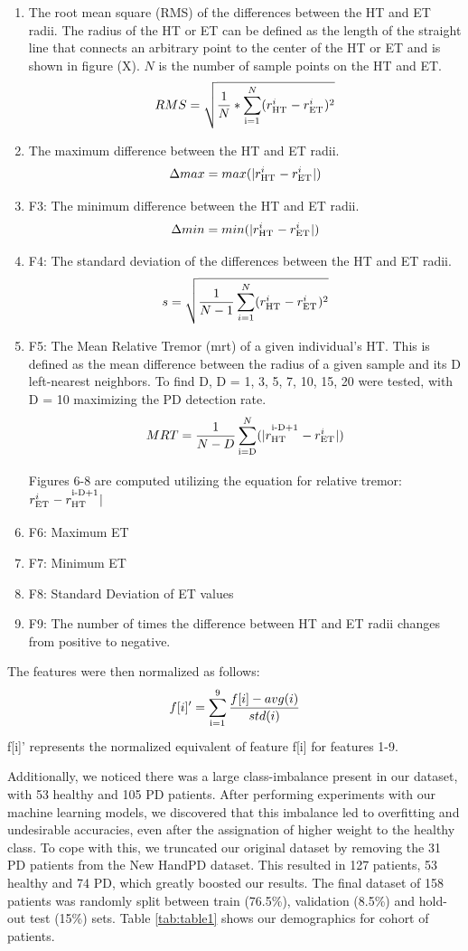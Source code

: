 \documentclass[pmlr,twocolumn,10pt]{jmlr} %
\let\SUP\textsuperscript
\begin{document}
\begin{enumerate}
\item The root mean square (RMS) of the differences between the HT and ET radii. The radius of the HT or ET can be defined as the length of the straight line that connects an arbitrary point to the center of the HT or ET and is shown in figure (X). $N$ is the number of sample points on the HT and ET.
\[RMS = \sqrt{\frac{1}{N} * \sum_\SUP{i=1}^N(r_\SUP{HT}^i - r_\SUP{ET}^i)^2}\]

\item The maximum difference between the HT and ET radii. 
\[\Delta max = max(|r_\SUP{HT}^i - r_\SUP{ET}^i|)\]

\item F3: The minimum difference between the HT and ET radii. 
\[\Delta min = min(|r_\SUP{HT}^i - r_\SUP{ET}^i|)\]

\item F4: The standard deviation of the differences between the HT and ET radii. 
\[s = \sqrt{\frac{1}{N-1}\sum_{i=1}^N(r_\SUP{HT}^i - r_\SUP{ET}^i)^2}\]

\item F5: The Mean Relative Tremor (mrt) of a given individual’s HT. This is defined as the mean difference between the radius of a given sample and its D left-nearest neighbors. To find D, D = {1, 3, 5, 7, 10, 15, 20} were tested, with D = 10 maximizing the PD detection rate. 
\[MRT = \frac{1}{N-D}\sum_\SUP{i=D}^N(|r_\SUP{HT}^\SUP{i-D+1} - r_\SUP{ET}^i|)\]

Figures 6-8 are computed utilizing the equation for relative tremor: $r_\SUP{ET}^i - r_\SUP{HT}^\SUP{i-D+1}|$
\item F6: Maximum ET
\item F7: Minimum ET
\item F8: Standard Deviation of ET values
\item F9: The number of times the difference between HT and ET radii changes from positive to negative.
\end{enumerate}

The features were then normalized as follows:
\[f[i]' = \sum_\SUP{i=1}^9\frac{f[i] - avg(i)}{std(i)}\]
f[i]' represents the normalized equivalent of feature f[i] for features 1-9.

Additionally, we noticed there was a large class-imbalance present in our dataset, with 53 healthy and 105 PD patients. After performing experiments with our machine learning models, we discovered that this imbalance led to overfitting and undesirable accuracies, even after the assignation of higher weight to the healthy class. To cope with this, we truncated our original dataset by removing the 31 PD patients from the New HandPD dataset. This resulted in 127 patients, 53 healthy and 74 PD, which greatly boosted our results. The final dataset of 158 patients was randomly split between train (76.5\%), validation (8.5\%) and hold-out test (15\%) sets. Table \ref{tab:table1} shows our demographics for cohort of patients. 
\end{document}

